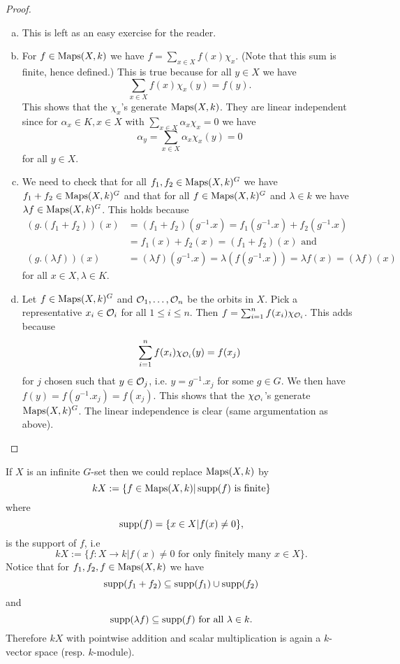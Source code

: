 \begin{proof}
 \begin{enumerate}[a)]
  \item
   This is left as an easy exercise for the reader.
  \item
   For $f \in \operatorname{Maps}(X,k)$ we have $f = \sum_{x \in X} f(x) \chi_x$. (Note that this sum is finite, hence defined.) This is true because for all $y \in X$ we have
   \[
    \sum_{x \in X} f(x) \chi_x(y) = f(y).
   \]
   This shows that the $\chi_x$'s generate $\operatorname{Maps}(X,k)$. They are linear independent since for $\alpha_x \in K, x \in X$ with $\sum_{x \in X} \alpha_x \chi_x = 0$ we have
   \[
    \alpha_y = \sum_{x \in X} \alpha_x \chi_x(y) = 0
   \]
   for all $y \in X$.
  \item
   We need to check that for all $f_1, f_2 \in \operatorname{Maps}(X,k)^G$ we have $f_1+f_2 \in \operatorname{Maps}(X,k)^G$ and that for all $f \in \operatorname{Maps}(X,k)^G$ and $\lambda \in k$ we have $\lambda f \in \operatorname{Maps}(X,k)^G$. This holds because
   \begin{align*}
    (g.(f_1+f_2))(x)
    &= (f_1+f_2)(g^{-1}.x) = f_1(g^{-1}.x) + f_2(g^{-1}.x) \\
    &= f_1(x) + f_2(x) = (f_1+f_2)(x) \text{ and} \\
    (g.(\lambda f))(x)
    &= (\lambda f)(g^{-1}.x) = \lambda (f(g^{-1}.x)) = \lambda f(x) = (\lambda f)(x)
   \end{align*}
   for all $x \in X, \lambda \in K$.
  \item
   Let $f \in \operatorname{Maps}(X,k)^G$ and $\mathcal{O}_1, \ldots, \mathcal{O}_n$ be the orbits in $X$. Pick a representative $x_i \in \mathcal{O}_i$ for all $1 \leq i \leq n$. Then $f = \sum_{i=1}^n f(x_i) \chi_{\mathcal{O}_i}$. This adds because
   \[
    \sum_{i=1}^n f(x_i) \chi_{\mathcal{O}_i}(y) = f(x_j)
   \]
   for $j$ chosen such that $y \in \mathcal{O}_j$, i.e. $y = g^{-1}.x_j$ for some $g \in G$. We then have $f(y) = f(g^{-1}.x_j) = f(x_j)$. This shows that the $\chi_{\mathcal{O}_i}$’s generate $\operatorname{Maps}(X,k)^G$. The linear independence is clear (same argumentation as above).
 \end{enumerate}
\end{proof}


If $X$ is an infinite $G$-set then we could replace $\operatorname{Maps}(X,k)$ by
\[
 kX := \{f \in \operatorname{Maps}(X,k) | \operatorname{supp}(f) \text{ is finite}\}
\]
where
\[
 \operatorname{supp}(f) = \{x \in X | f(x) \neq 0\},
\]
is the support of $f$, i.e
\[
 kX := \{f : X \to k | f(x) \neq 0 \text{ for only finitely many } x \in X\}.
\]
Notice that for $f_1, f_2, f \in \operatorname{Maps}(X,k)$ we have
\[
 \operatorname{supp}(f_1+f_2) \subseteq \operatorname{supp}(f_1) \cup \operatorname{supp}(f_2)
\]
and
\[
 \operatorname{supp}(\lambda f) \subseteq \operatorname{supp}(f) \text{ for all } \lambda \in k.
\]
Therefore $kX$ with pointwise addition and scalar multiplication is again a $k$-vector space (resp. $k$-module).

